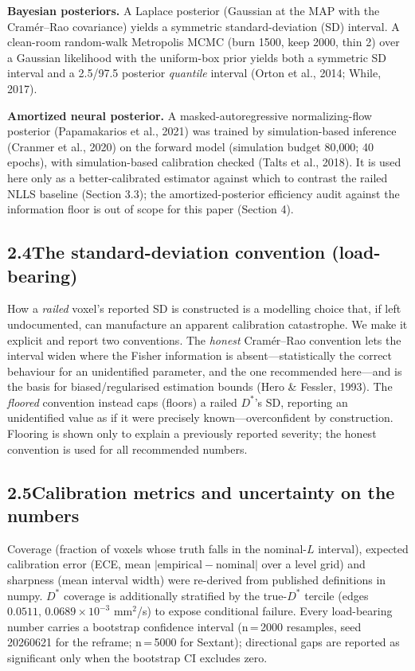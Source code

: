 \documentclass[11pt]{article}
\newcommand{\Dstar}{\ensuremath{D^{*}}}
\begin{document}
\textbf{Bayesian posteriors.} A Laplace posterior (Gaussian at the MAP with the
Cram\'er--Rao covariance) yields a symmetric standard-deviation (SD) interval. A
clean-room random-walk Metropolis MCMC (burn 1500, keep 2000, thin 2) over a Gaussian
likelihood with the uniform-box prior yields both a symmetric SD interval and a 2.5/97.5
posterior \emph{quantile} interval (Orton et al., 2014; While, 2017).

\textbf{Amortized neural posterior.} A masked-autoregressive normalizing-flow posterior
(Papamakarios et al., 2021) was trained by simulation-based inference (Cranmer et al.,
2020) on the forward model (simulation budget 80{,}000; 40 epochs), with
simulation-based calibration checked (Talts et al., 2018). It is used here only as a
better-calibrated estimator against which to contrast the railed NLLS baseline (Section
3.3); the amortized-posterior efficiency audit against the information floor is out of
scope for this paper (Section 4).

\subsection*{2.4\quad The standard-deviation convention (load-bearing)}

How a \emph{railed} voxel's reported SD is constructed is a modelling choice that, if
left undocumented, can manufacture an apparent calibration catastrophe. We make it
explicit and report two conventions. The \emph{honest} Cram\'er--Rao convention lets the
interval widen where the Fisher information is absent---statistically the correct
behaviour for an unidentified parameter, and the one recommended here---and is the basis
for biased/regularised estimation bounds (Hero \& Fessler, 1993). The \emph{floored}
convention instead caps (floors) a railed \Dstar{}'s SD, reporting an unidentified value
as if it were precisely known---overconfident by construction. Flooring is shown only to
explain a previously reported severity; the honest convention is used for all
recommended numbers.

\subsection*{2.5\quad Calibration metrics and uncertainty on the numbers}

Coverage (fraction of voxels whose truth falls in the nominal-$L$ interval), expected
calibration error (ECE, mean $|\text{empirical}-\text{nominal}|$ over a level grid) and
sharpness (mean interval width) were re-derived from published definitions in numpy.
\Dstar{} coverage is additionally stratified by the true-\Dstar{} tercile
(edges $0.0511,\,0.0689\times10^{-3}$ mm$^2$/s) to expose conditional failure.
Every load-bearing number carries a bootstrap confidence interval (n\,=\,2000 resamples,
seed 20260621 for the reframe; n\,=\,5000 for Sextant); directional gaps are reported as
significant only when the bootstrap CI excludes zero.
\end{document}
